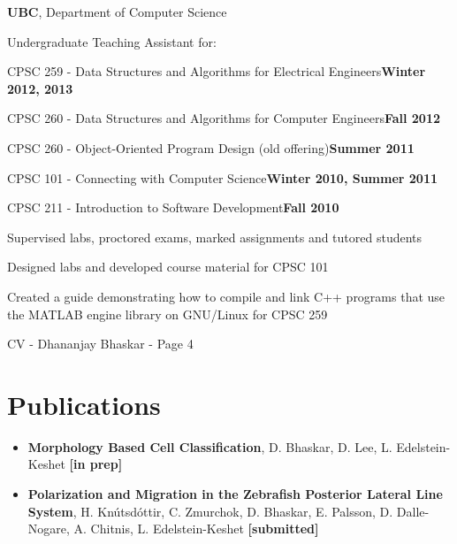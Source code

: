 \documentclass[margin,line]{res}
\newenvironment{list1}{
  \begin{list}{\ding{113}}{
      \setlength{\itemsep}{0in}
      \setlength{\parsep}{0in} \setlength{\parskip}{0in}
      \setlength{\topsep}{0in} \setlength{\partopsep}{0in} 
      \setlength{\leftmargin}{0.17in}}}{\end{list}}
\newenvironment{list3}{
  \begin{list}{\textopenbullet}{
      \setlength{\itemsep}{0in}
      \setlength{\parsep}{0in} \setlength{\parskip}{0in}
      \setlength{\topsep}{0in} \setlength{\partopsep}{0in} 
      \setlength{\leftmargin}{0.1in}}}{\end{list}}
\begin{document}
\begin{resume}
{\bf  UBC}, Department of Computer Science\\
\vspace*{-.2cm}
\begin{list1}
\item[] Undergraduate Teaching Assistant for:\\[-0.1cm]
\item[] CPSC 259 - Data Structures and Algorithms for Electrical Engineers\hfill{\bf Winter 2012, 2013}
\item[] CPSC 260 - Data Structures and Algorithms for Computer Engineers\hfill{\bf Fall 2012}
\item[] CPSC 260 - Object-Oriented Program Design (old offering)\hfill{\bf Summer 2011}
\item[] CPSC 101 - Connecting with Computer Science\hfill{\bf Winter 2010, Summer 2011}
\item[] CPSC 211 - Introduction to Software Development\hfill{\bf Fall 2010}\\
\begin{list3}
\vspace*{-.1cm}
\item Supervised labs, proctored exams, marked assignments and tutored students
\item Designed labs and developed course material for CPSC 101
\item Created a guide demonstrating how to compile and link C++ programs that use the MATLAB engine library on GNU/Linux for CPSC 259
\end{list3}
\end{list1}

\newpage
\begin{flushright}
CV - Dhananjay Bhaskar - Page 4
\end{flushright}
\vspace*{.2cm}

\section{\sc Publications}

{\renewcommand\leftmargini{0em}
\begin{itemize}

\item {\bf Morphology Based Cell Classification}, D. Bhaskar, D. Lee, L. Edelstein-Keshet {\bf[in prep]}
\vspace*{.1cm}
\item {\bf Polarization and Migration in the Zebrafish Posterior Lateral Line System}, H. Kn\'{u}tsd\'{o}ttir, C. Zmurchok, D. Bhaskar, E. Palsson, D. Dalle-Nogare, A. Chitnis, L. Edelstein-Keshet {\bf[submitted]}
\end{itemize}
}


\end{resume}
\end{document}

